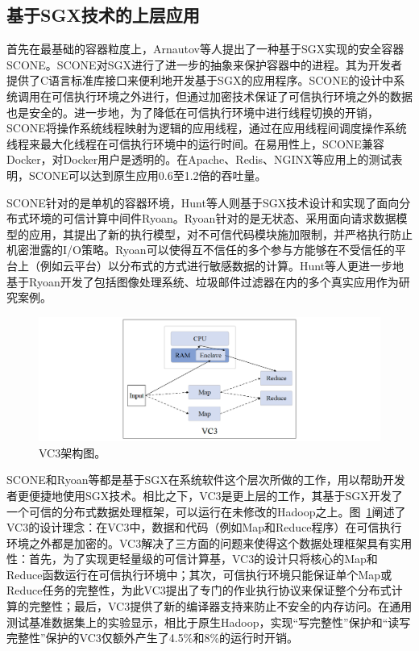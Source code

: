 \subsection{基于SGX技术的上层应用}

首先在最基础的容器粒度上，Arnautov等人提出了一种基于SGX实现的安全容器SCONE。SCONE对SGX进行了进一步的抽象来保护容器中的进程。其为开发者提供了C语言标准库接口来便利地开发基于SGX的应用程序。SCONE的设计中系统调用在可信执行环境之外进行，但通过加密技术保证了可信执行环境之外的数据也是安全的。进一步地，为了降低在可信执行环境中进行线程切换的开销，SCONE将操作系统线程映射为逻辑的应用线程，通过在应用线程间调度操作系统线程来最大化线程在可信执行环境中的运行时间。在易用性上，SCONE兼容Docker，对Docker用户是透明的。在Apache、Redis、NGINX等应用上的测试表明，SCONE可以达到原生应用0.6至1.2倍的吞吐量。

SCONE针对的是单机的容器环境，Hunt等人则基于SGX技术设计和实现了面向分布式环境的可信计算中间件Ryoan。Ryoan针对的是无状态、采用面向请求数据模型的应用，其提出了新的执行模型，对不可信代码模块施加限制，并严格执行防止机密泄露的I/O策略。Ryoan可以使得互不信任的多个参与方能够在不受信任的平台上（例如云平台）以分布式的方式进行敏感数据的计算。Hunt等人更进一步地基于Ryoan开发了包括图像处理系统、垃圾邮件过滤器在内的多个真实应用作为研究案例。

\begin{figure}[h]
    \centerline{\includegraphics[width=\textwidth]{figures/vc3-arch.png}}
    \caption{VC3架构图。}
    \label{vc3_arch}
\end{figure}

SCONE和Ryoan等都是基于SGX在系统软件这个层次所做的工作，用以帮助开发者更便捷地使用SGX技术。相比之下，VC3是更上层的工作，其基于SGX开发了一个可信的分布式数据处理框架，可以运行在未修改的Hadoop之上。图~\ref{vc3_arch}阐述了VC3的设计理念：在VC3中，数据和代码（例如Map和Reduce程序）在可信执行环境之外都是加密的。VC3解决了三方面的问题来使得这个数据处理框架具有实用性：首先，为了实现更轻量级的可信计算基，VC3的设计只将核心的Map和Reduce函数运行在可信执行环境中；其次，可信执行环境只能保证单个Map或Reduce任务的完整性，为此VC3提出了专门的作业执行协议来保证整个分布式计算的完整性；最后，VC3提供了新的编译器支持来防止不安全的内存访问。在通用测试基准数据集上的实验显示，相比于原生Hadoop，实现“写完整性”保护和“读写完整性”保护的VC3仅额外产生了4.5\%和8\%的运行时开销。

